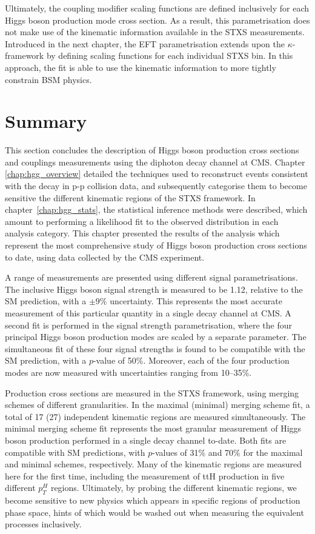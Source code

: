 Ultimately, the coupling modifier scaling functions are defined inclusively for each Higgs boson production mode cross section. As a result, this parametrisation does not make use of the kinematic information available in the STXS measurements. Introduced in the next chapter, the EFT parametrisation extends upon the $\kappa$-framework by defining scaling functions for each individual STXS bin. In this approach, the fit is able to use the kinematic information to more tightly constrain BSM physics.

\FloatBarrier

\section{Summary}
This section concludes the description of Higgs boson production cross sections and couplings measurements using the diphoton decay channel at CMS. Chapter \ref{chap:hgg_overview} detailed the techniques used to reconstruct events consistent with the \Hgg decay in p-p collision data, and subsequently categorise them to become sensitive the different kinematic regions of the STXS framework. In chapter~\ref{chap:hgg_stats}, the statistical inference methods were described, which amount to performing a likelihood fit to the observed \mgg distribution in each analysis category. This chapter presented the results of the analysis which represent the most comprehensive study of Higgs boson production cross sections to date, using data collected by the CMS experiment.

A range of measurements are presented using different signal parametrisations. The inclusive Higgs boson signal strength is measured to be 1.12, relative to the SM prediction, with a $\pm 9\%$ uncertainty. This represents the most accurate measurement of this particular quantity in a single decay channel at CMS. A second fit is performed in the signal strength parametrisation, where the four principal Higgs boson production modes are scaled by a separate parameter. The simultaneous fit of these four signal strengths is found to be compatible with the SM prediction, with a $p$-value of 50\%. Moreover, each of the four production modes are now measured with uncertainties ranging from 10--35\%.

Production cross sections are measured in the STXS framework, using merging schemes of different granularities. In the maximal (minimal) merging scheme fit, a total of 17 (27) independent kinematic regions are measured simultaneously. The minimal merging scheme fit represents the most granular measurement of Higgs boson production performed in a single decay channel to-date. Both fits are compatible with SM predictions, with $p$-values of 31\% and 70\% for the maximal and minimal schemes, respectively. Many of the kinematic regions are measured here for the first time, including the measurement of ttH production in five different $p_T^H$ regions. Ultimately, by probing the different kinematic regions, we become sensitive to new physics which appears in specific regions of production phase space, hints of which would be washed out when measuring the equivalent processes inclusively. 

